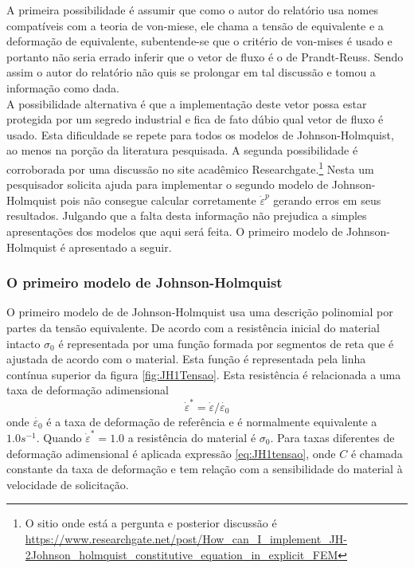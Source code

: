  A primeira possibilidade é assumir que como o autor do relatório usa nomes compatíveis com a teoria de von-miese, ele chama a tensão de equivalente e a deformação de equivalente, subentende-se que o critério de von-mises é usado e portanto não seria errado inferir que o vetor de fluxo é o de Prandt-Reuss. Sendo assim o autor do relatório não quis se prolongar em tal discussão e tomou a informação como dada. \\
 
 A possibilidade alternativa 
 é que a implementação deste vetor possa estar protegida por um segredo industrial e fica de fato dúbio qual vetor de fluxo é usado. Esta dificuldade se repete para todos os modelos de Johnson-Holmquist, ao menos na porção da literatura pesquisada. A segunda possibilidade é corroborada por uma discussão no site acadêmico Researchgate.\footnote{ O sitio onde está a pergunta e posterior discussão é  \url{https://www.researchgate.net/post/How_can_I_implement_JH-2Johnson_holmquist_constitutive_equation_in_explicit_FEM} } Nesta um pesquisador solicita ajuda para implementar o segundo modelo de Johnson-Holmquist pois não consegue calcular corretamente $ \dot{\varepsilon}^p $ gerando erros em seus resultados. Julgando que a falta desta informação não prejudica a simples apresentações dos modelos que aqui será feita. O primeiro modelo de Johnson-Holmquist é apresentado a seguir. \\
 
 \subsubsection{O primeiro modelo de Johnson-Holmquist}
 
O primeiro modelo de de Johnson-Holmquist usa uma descrição polinomial por partes da tensão equivalente. De acordo com \cite{holmquist_johnson_2002} a resistência inicial do material intacto $ \sigma_0 $ é representada por uma função formada por segmentos de reta que é ajustada de acordo com o material. Esta função é representada pela linha contínua superior da figura \ref{fig:JH1Tensao}. Esta resistência é relacionada a uma taxa de deformação adimensional
\begin{equation}
    \dot{\varepsilon}^* = \dot{\varepsilon}/\dot{\varepsilon_0}
\end{equation}
onde $ \dot{\varepsilon_0} $ 
é a taxa de deformação de referência e é normalmente equivalente a $1.0 s^{-1} $. Quando $ \dot{\varepsilon}^* = 1.0 $ a resistência do material é $ \sigma_0 $. Para taxas diferentes de deformação adimensional é aplicada expressão \ref{eq:JH1tensao}, onde $ C $ é chamada constante da taxa de deformação e tem relação com a sensibilidade do material à velocidade de solicitação. 

